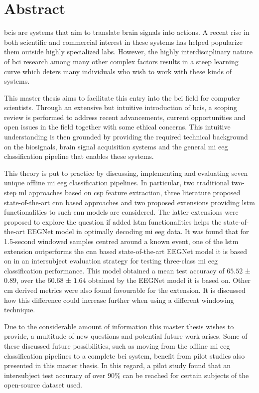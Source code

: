 \glsresetall

\chapter*{Abstract}
\label{ch:abstract}

\Glspl{bci} are systems that aim to translate brain signals into actions.
A recent rise in both scientific and commercial interest in these systems has helped popularize them outside highly specialized labs.
However, the highly interdisciplinary nature of \gls{bci} research among many other complex factors results in a steep learning curve which deters many individuals who wish to work with these kinds of systems.

This master thesis aims to facilitate this entry into the \gls{bci} field for computer scientists.
Through an extensive but intuitive introduction of \glspl{bci}, a scoping review is performed to address recent advancements, current opportunities and open issues in the field together with some ethical concerns.
This intuitive understanding is then grounded by providing the required technical background on the \glspl{biosignal}, brain signal acquisition systems and the general \gls{mi} \gls{eeg} classification pipeline that enables these systems.

This theory is put to practice by discussing, implementing and evaluating seven unique offline \gls{mi} \gls{eeg} classification pipelines.
In particular, two traditional two-step \gls{ml} approaches based on \gls{csp} feature extraction, three literature proposed state-of-the-art \gls{cnn} based approaches and two proposed extensions providing \gls{lstm} functionalities to such \gls{cnn} models are considered.
The latter extensions were proposed to explore the question if added \gls{lstm} functionalities helps the state-of-the-art EEGNet model in optimally decoding \gls{mi} \gls{eeg} data.
It was found that for 1.5-second windowed samples centred around a known event, one of the \gls{lstm} extension outperforms the \gls{cnn} based state-of-the-art EEGNet model it is based on in an intersubject evaluation strategy for testing three-class \gls{mi} \gls{eeg} classification performance.
This model obtained a mean test accuracy of  $65.52$ ± $0.89$, over the $60.68$ ± $1.64$ obtained by the EEGNet model it is based on.
Other \gls{cm} derived metrics were also found favourable for the extension.
It is discussed how this difference could increase further when using a different windowing technique.

Due to the considerable amount of information this master thesis wishes to provide, a multitude of new questions and potential future work arises.
Some of these discussed future possibilities, such as moving from the offline \gls{mi} \gls{eeg} classification pipelines to a complete \gls{bci} system, benefit from pilot studies also presented in this master thesis.
In this regard, a pilot study found that an intersubject test accuracy of over 90\% can be reached for certain subjects of the open-source dataset used.